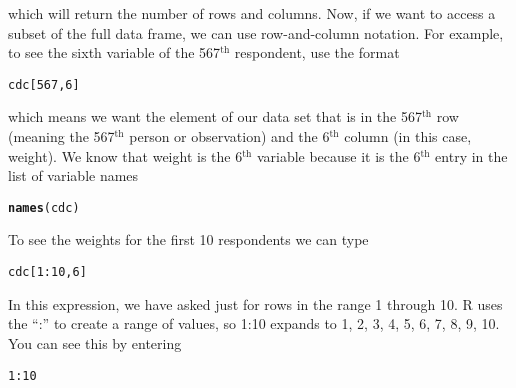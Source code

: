 \documentclass{article}\usepackage[]{graphicx}\usepackage[]{color}
\makeatletter
\newcommand{\hlnum}[1]{\textcolor[rgb]{0.686,0.059,0.569}{#1}}%
\newcommand{\hlopt}[1]{\textcolor[rgb]{0,0,0}{#1}}%
\newcommand{\hlstd}[1]{\textcolor[rgb]{0.345,0.345,0.345}{#1}}%
\newcommand{\hlkwd}[1]{\textcolor[rgb]{0.737,0.353,0.396}{\textbf{#1}}}%
\newenvironment{kframe}{%
 \def\at@end@of@kframe{}%
 \ifinner\ifhmode%
  \def\at@end@of@kframe{\end{minipage}}%
  \begin{minipage}{\columnwidth}%
 \fi\fi%
 \def\FrameCommand##1{\hskip\@totalleftmargin \hskip-\fboxsep
 \colorbox{shadecolor}{##1}\hskip-\fboxsep
     \hskip-\linewidth \hskip-\@totalleftmargin \hskip\columnwidth}%
 \MakeFramed {\advance\hsize-\width
   \@totalleftmargin\z@ \linewidth\hsize
   \@setminipage}}%
 {\par\unskip\endMakeFramed%
 \at@end@of@kframe}
\newenvironment{knitrout}{}{} %
\makeatother
\begin{document}
which will return the number of rows and columns. Now, if we want to access a subset of the full data frame, we can use row-and-column notation. For example, to see the sixth variable of the 567$^{\textrm{th}}$ respondent, use the format

\begin{knitrout}
\color{fgcolor}\begin{kframe}
\begin{alltt}
\hlstd{cdc[}\hlnum{567}\hlstd{,}\hlnum{6}\hlstd{]}
\end{alltt}
\end{kframe}
\end{knitrout}

which means we want the element of our data set that is in the 567$^{\textrm{th}}$ row (meaning the 567$^{\textrm{th}}$ person or observation) and the 6$^{\textrm{th}}$ column (in this case, weight). We know that \hlstd{weight} is the 6$^{\textrm{th}}$ variable because it is the 6$^{\textrm{th}}$ entry in the list of variable names

\begin{knitrout}
\color{fgcolor}\begin{kframe}
\begin{alltt}
\hlkwd{names}\hlstd{(cdc)}
\end{alltt}
\end{kframe}
\end{knitrout}

To see the weights for the first 10 respondents we can type

\begin{knitrout}
\color{fgcolor}\begin{kframe}
\begin{alltt}
\hlstd{cdc[}\hlnum{1}\hlopt{:}\hlnum{10}\hlstd{,}\hlnum{6}\hlstd{]}
\end{alltt}
\end{kframe}
\end{knitrout}

In this expression, we have asked just for rows in the range 1 through 10.  R uses the ``:'' to create a range of values, so 1:10 expands to 1, 2, 3, 4, 5, 6, 7, 8, 9, 10. You can see this by entering

\begin{knitrout}
\color{fgcolor}\begin{kframe}
\begin{alltt}
\hlnum{1}\hlopt{:}\hlnum{10}
\end{alltt}
\end{kframe}
\end{knitrout}
\end{document}

